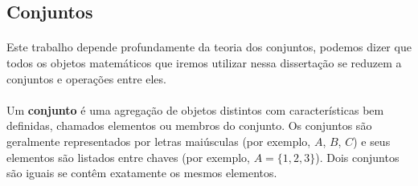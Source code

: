 \documentclass[12pt,a4paper]{article}
\begin{document}
\subsection{Conjuntos}
\paragraph{}
Este trabalho depende profundamente da teoria dos conjuntos, podemos dizer que todos os objetos matemáticos que iremos utilizar nessa dissertação se reduzem a conjuntos e operações entre eles.

\paragraph{}
Um \textbf{conjunto} é uma agregação de objetos distintos com características bem definidas, chamados elementos ou membros do conjunto. Os conjuntos são geralmente representados por letras maiúsculas (por exemplo, \(A\), \(B\), \(C\)) e seus elementos são listados entre chaves (por exemplo, \(A = \{1, 2, 3\}\)). Dois conjuntos são iguais se contêm exatamente os mesmos elementos.
\end{document}
